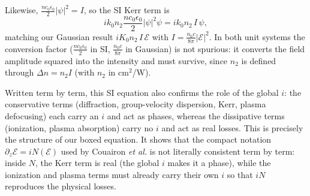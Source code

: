 \documentclass[11pt,a4paper]{article}
\begin{document}
Likewise, $\frac{nc_0\epsilon_0}{2}|\psi|^2 = I$, so the SI
Kerr term is
\begin{equation*}
ik_0n_2\frac{nc_0\epsilon_0}{2}|\psi|^2\psi = ik_0n_2\,I\,\psi ,
\end{equation*}
matching our Gaussian result $iK_0n_2\,I\,\mathcal{E}$ with
$I = \frac{n_0c}{8\pi}|\mathcal{E}|^2$. In both unit systems the conversion factor
($\frac{nc_0\epsilon_0}{2}$ in SI, $\frac{n_0c}{8\pi}$ in Gaussian) is not spurious:
it converts the field amplitude squared into the intensity and must survive,
since $n_2$ is defined through $\Delta n = n_2 I$ (with $n_2$ in cm$^2$/W).

Written term by term, this SI
equation also confirms the role of the global $i$: the conservative terms
(diffraction, group-velocity dispersion, Kerr, plasma defocusing) each carry an
$i$ and act as phases, whereas the dissipative terms (ionization, plasma
absorption) carry no $i$ and act as real losses. This is precisely the structure
of our boxed equation. It shows that the compact notation $\partial_z\mathcal{E}
= i N(\mathcal{E})$ used by Couairon \emph{et al.} is not literally consistent
term by term: inside $N$, the Kerr term is real (the global $i$ makes it a phase),
while the ionization and plasma terms must already carry their own $i$ so that
$iN$ reproduces the physical losses.
\end{document}
